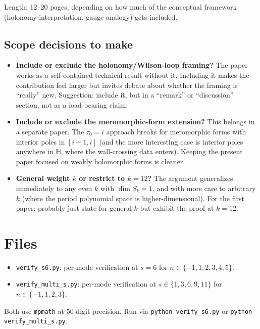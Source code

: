 \documentclass[11pt]{article}
\newcommand{\HH}{\mathbb{H}}
\begin{document}
Length: 12--20 pages, depending on how much of the conceptual framework (holonomy interpretation, gauge analogy) gets included.

\subsection*{Scope decisions to make}

\begin{itemize}
\item \textbf{Include or exclude the holonomy/Wilson-loop framing?} The paper works as a self-contained technical result without it. Including it makes the contribution feel larger but invites debate about whether the framing is ``really'' new. Suggestion: include it, but in a ``remark'' or ``discussion'' section, not as a load-bearing claim.
\item \textbf{Include or exclude the meromorphic-form extension?} This belongs in a separate paper. The $\tau_0 = i$ approach breaks for meromorphic forms with interior poles in $[i-1, i]$ (and the more interesting case is interior poles anywhere in $\HH$, where the wall-crossing data enters). Keeping the present paper focused on weakly holomorphic forms is cleaner.
\item \textbf{General weight $k$ or restrict to $k = 12$?} The argument generalizes immediately to any even $k$ with $\dim S_k = 1$, and with more care to arbitrary $k$ (where the period polynomial space is higher-dimensional). For the first paper: probably just state for general $k$ but exhibit the proof at $k = 12$.
\end{itemize}

\section{Files}

\begin{itemize}
\item \texttt{verify\_s6.py}: per-mode verification at $s = 6$ for $n \in \{-1, 1, 2, 3, 4, 5\}$.
\item \texttt{verify\_multi\_s.py}: per-mode verification at $s \in \{1, 3, 6, 9, 11\}$ for $n \in \{-1, 1, 2, 3\}$.
\end{itemize}

Both use \texttt{mpmath} at 50-digit precision. Run via \texttt{python verify\_s6.py} or \texttt{python verify\_multi\_s.py}.
\end{document}
